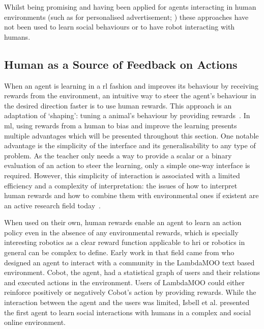 	
	Whilst being promising and having been applied for agents interacting in human environments (such as for personalised advertisement;  \citealt{theocharous2015personalized})	these approaches have not been used to learn social behaviours or to have robot interacting with humans.

\subsection{Human as a Source of Feedback on Actions} \label{ssec:back_feedback}

When an agent is learning in a \gls{rl} fashion and improves its behaviour by receiving rewards from the environment, an intuitive way to steer the agent's behaviour in the desired direction faster is to use human rewards. This approach is an adaptation of `shaping': tuning a animal's behaviour by providing rewards~\citep{bouton2007learning}. In \gls{ml}, using rewards from a human to bias and improve the learning presents multiple advantages which will be presented throughout this section. One notable advantage is the simplicity of the interface and its generalisability to any type of problem. As the teacher only needs a way to provide a scalar or a binary evaluation of an action to steer the learning, only a simple one-way interface is required.  However, this simplicity of interaction is associated with a limited efficiency and a complexity of interpretation: the issues of how to interpret human rewards and how to combine them with environmental ones if existent are an active research field today~\citep{knox2010combining}.

When used on their own, human rewards enable an agent to learn an action policy even in the absence of any environmental rewards, which is specially interesting robotics as a clear reward function applicable to \gls{hri} or robotics in general can be complex to define. Early work in that field came from \cite{isbell2006cobot} who designed an agent to interact with a community in the LambdaMOO text based environment. Cobot, the agent, had a statistical graph of users and their relations and executed actions in the environment. Users of LambdaMOO could either reinforce positively or negatively Cobot's action by providing rewards. While the interaction between the agent and the users was limited, Isbell et al. presented the first agent to learn social interactions with humans in a complex and social online environment. 

